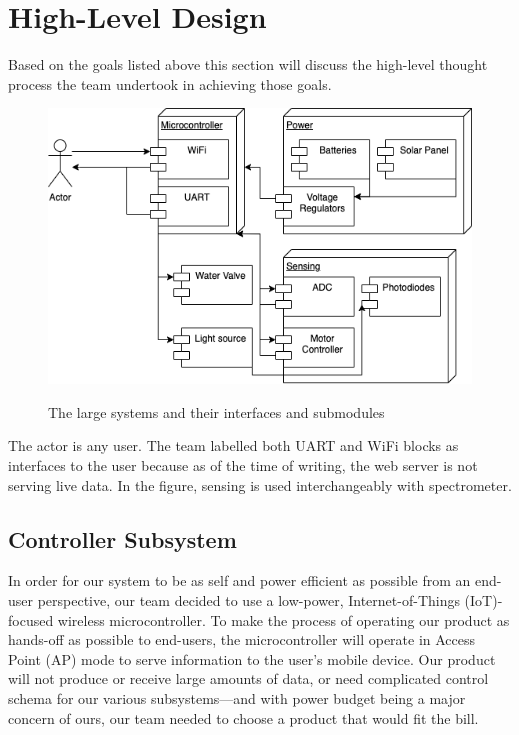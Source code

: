 \documentclass[journal]{IEEEtran}
\begin{document}
\section{High-Level Design}
Based on the goals listed above this section will discuss the high-level thought
process the team undertook in achieving those goals.
\begin{figure}[H]
    \centering
    \includegraphics[width=\linewidth]{images/Flowchart.png}
    \label{fig:flowchart}
    \caption{The large systems and their interfaces and submodules}
\end{figure}
The actor is any user. The team labelled both UART and WiFi blocks as interfaces to the user
because as of the time of writing, the web server is not serving live data. In the figure, sensing is used 
interchangeably with spectrometer.
\subsection{Controller Subsystem}

In order for our system to be as self and power efficient as possible from an end-user perspective, our 
team decided to use a low-power, Internet-of-Things (IoT)-focused wireless microcontroller. To make the 
process of operating our product as hands-off as possible to end-users, the microcontroller will operate 
in Access Point (AP) mode to serve information to the user's mobile device. Our product will not produce 
or receive large amounts of data, or need complicated control schema for our various subsystems---and with 
power budget being a major concern of ours, our team needed to choose a product that would fit the bill.
\end{document}
